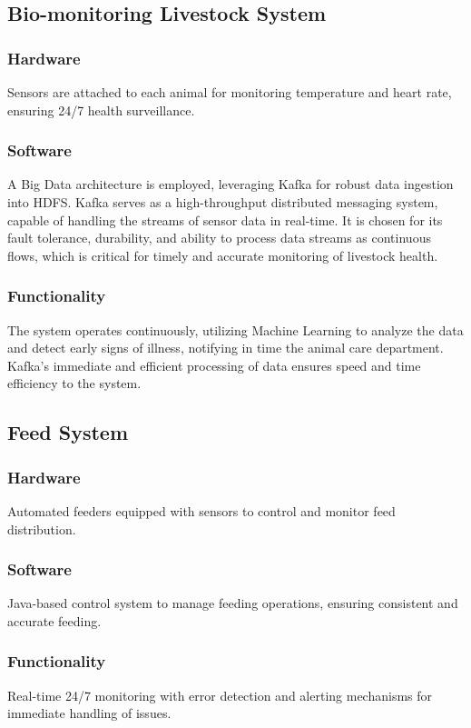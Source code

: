 \documentclass[conference]{IEEEtran}
\begin{document}
\subsection{Bio-monitoring Livestock System}
\subsubsection{Hardware}
Sensors are attached to each animal for monitoring temperature and heart rate, ensuring 24/7 health surveillance.
\subsubsection{Software}
A Big Data architecture is employed, leveraging Kafka for robust data ingestion into HDFS. Kafka serves as a high-throughput distributed messaging system, capable of handling the streams of sensor data in real-time. It is chosen for its fault tolerance, durability, and ability to process data streams as continuous flows, which is critical for timely and accurate monitoring of livestock health.
\subsubsection{Functionality}
The system operates continuously, utilizing Machine Learning to analyze the data and detect early signs of illness, notifying in time the animal care department. Kafka's immediate and efficient processing of data ensures speed and time efficiency to the system.


\subsection{Feed System}
\subsubsection{Hardware}
Automated feeders equipped with sensors to control and monitor feed distribution.
\subsubsection{Software}
Java-based control system to manage feeding operations, ensuring consistent and accurate feeding.
\subsubsection{Functionality}
Real-time 24/7 monitoring with error detection and alerting mechanisms for immediate handling of issues.
\end{document}
